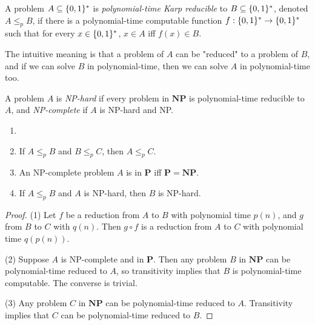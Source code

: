     \begin{defn} \label{def_poly_karp}
        A problem $A \subseteq \{0,1\}^\ast$ is \emph{polynomial-time Karp reducible} to $B \subseteq \{0,1\}^\ast$, denoted $A \leq_p B$, if there is a polynomial-time computable function $f: \{0,1\}^\ast \rightarrow \{0,1\}^\ast$ such that for every $x \in \{0,1\}^\ast$, $x \in A$ iff $f(x) \in B$.
    \end{defn}
        
    The intuitive meaning is that a problem of $A$ can be "reduced" to a problem of $B$, and if we can solve $B$ in polynomial-time, then we can solve $A$ in polynomial-time too.
        
    \begin{defn}[NP-complete] \label{def_npc}
        A problem $A$ is \emph{NP-hard} if every problem in $\mathbf{NP}$ is polynomial-time reducible to $A$, and \emph{NP-complete} if $A$ is NP-hard and NP.
    \end{defn}
        
    \begin{thm} \label{thm_leqp_transitive}
        \begin{enumerate}
            \item[]
            \item If $A \leq_p B$ and $B \leq_p C$, then $A \leq_p C$.
            \item An NP-complete problem $A$ is in $\mathbf{P}$ iff $\mathbf{P}=\mathbf{NP}$.
            \item If $A \leq_p B$ and $A$ is NP-hard, then $B$ is NP-hard.
        \end{enumerate}
    \end{thm}
        
    \begin{proof}
        (1) Let $f$ be a reduction from $A$ to $B$ with polynomial time $p(n)$, and $g$ from $B$ to $C$ with $q(n)$. Then $g \circ f$ is a reduction from $A$ to $C$ with polynomial time $q(p(n))$.
            
        (2) Suppose $A$ is NP-complete and in $\mathbf{P}$. Then any problem $B$ in $\mathbf{NP}$ can be polynomial-time reduced to $A$, so transitivity implies that $B$ is polynomial-time computable. The converse is trivial.
            
        (3) Any problem $C$ in $\mathbf{NP}$ can be polynomial-time reduced to $A$. Transitivity implies that $C$ can be polynomial-time reduced to $B$.
    \end{proof}
        
